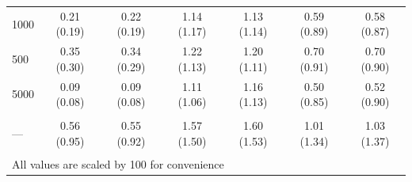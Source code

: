 \documentclass[AMA,STIX1COL,doublespace]{WileyNJD-v2}
\begin{document}
\begin{table}
\begin{tabular}[t]{lcccccc}
\hspace{1em}1000 & 0.21 (0.19) & 0.22 (0.19) & 1.14 (1.17) & 1.13 (1.14) & 0.59 (0.89) & 0.58 (0.87)\\
\hspace{1em}500 & 0.35 (0.30) & 0.34 (0.29) & 1.22 (1.13) & 1.20 (1.11) & 0.70 (0.91) & 0.70 (0.90)\\
\hspace{1em}5000 & 0.09 (0.08) & 0.09 (0.08) & 1.11 (1.06) & 1.16 (1.13) & 0.50 (0.85) & 0.52 (0.90)\\
\addlinespace[0.75em]
\multicolumn{7}{l}{\textbf{Overall}}\\
\hline
\hspace{1em}--- & 0.56 (0.95) & 0.55 (0.92) & 1.57 (1.50) & 1.60 (1.53) & 1.01 (1.34) & 1.03 (1.37)\\
\bottomrule
\multicolumn{7}{l}{\textsuperscript{} All values are scaled by 100 for convenience}\\
\end{tabular}
\end{table}
\end{document}
